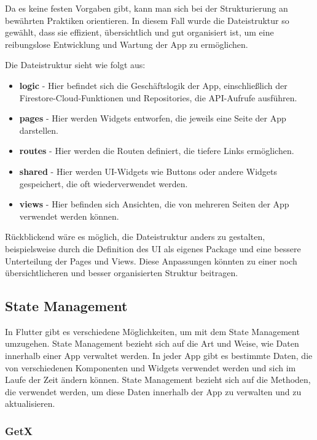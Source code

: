 Da es keine festen Vorgaben gibt, kann man sich bei der
Strukturierung an bewährten Praktiken orientieren. In diesem
Fall wurde die Dateistruktur so gewählt, dass sie effizient,
übersichtlich und gut organisiert ist, um eine reibungslose
Entwicklung und Wartung der App zu ermöglichen.


Die Dateistruktur sieht wie folgt aus:

\begin{itemize}
  \item \textbf{logic} - Hier befindet sich die Geschäftslogik der App, einschließlich der Firestore-Cloud-Funktionen und Repositories, die API-Aufrufe ausführen.
  \item \textbf{pages} - Hier werden Widgets entworfen, die jeweils eine Seite der App darstellen.
  \item \textbf{routes} - Hier werden die Routen definiert, die tiefere Links ermöglichen.
  \item \textbf{shared} - Hier werden UI-Widgets wie Buttons oder andere Widgets gespeichert, die oft wiederverwendet werden.
  \item \textbf{views} - Hier befinden sich Ansichten, die von mehreren Seiten der App verwendet werden können.
\end{itemize}

Rückblickend wäre es möglich, die Dateistruktur anders zu gestalten, beispielsweise durch die Definition des UI als eigenes Package und eine bessere Unterteilung der Pages und Views. Diese Anpassungen könnten zu einer noch übersichtlicheren und besser organisierten Struktur beitragen.

\subsection{State Management}
In Flutter gibt es verschiedene Möglichkeiten\cite{flutter-docs-interactive}\cite{flutter-state-management-blog}, um mit dem State Management umzugehen. State Management bezieht sich auf die Art und Weise, wie Daten innerhalb einer App verwaltet werden. In jeder App gibt es bestimmte Daten, die von verschiedenen Komponenten und Widgets verwendet werden und sich im Laufe der Zeit ändern können. State Management bezieht sich auf die Methoden, die verwendet werden, um diese Daten innerhalb der App zu verwalten und zu aktualisieren.

\subsubsection{GetX}

